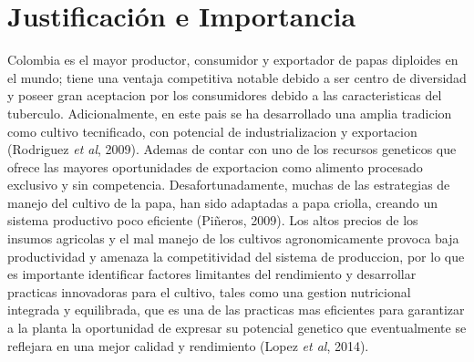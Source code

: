 \section{Justificaci\'on e Importancia}

Colombia es el mayor productor, consumidor y exportador de papas diploides en el mundo; tiene una ventaja competitiva notable debido a ser centro de diversidad y poseer gran aceptacion por los consumidores debido a las caracteristicas del tuberculo. Adicionalmente, en este pais se ha desarrollado una amplia tradicion como cultivo tecnificado, con potencial de industrializacion y exportacion (Rodriguez \textit{et al}, 2009). Ademas de contar con uno de los recursos geneticos que ofrece las mayores oportunidades de exportacion como alimento procesado exclusivo y sin competencia. Desafortunadamente, muchas de las estrategias de manejo del cultivo de la papa, han sido adaptadas a papa criolla, creando un sistema productivo poco eficiente (Piñeros, 2009). Los altos precios de los insumos agricolas y el mal manejo de los cultivos agronomicamente provoca  baja productividad y amenaza la competitividad del sistema de produccion, por lo que es importante identificar factores limitantes del rendimiento y desarrollar practicas innovadoras para el cultivo, tales como una gestion nutricional integrada y equilibrada, que es una de las practicas mas eficientes para garantizar a la planta la oportunidad de expresar su potencial genetico que eventualmente se reflejara en una mejor calidad y rendimiento (Lopez \textit{et al}, 2014).\\
 

